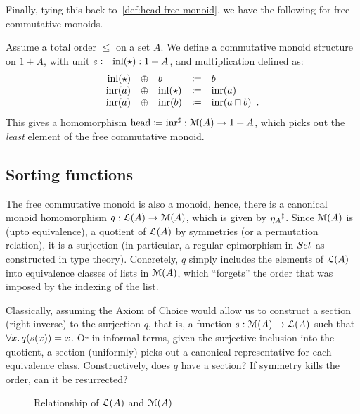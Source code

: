 Finally, tying this back to~\cref{def:head-free-monoid}, we have the following for free commutative monoids.
\begin{definition}
    \label{def:head-free-commutative-monoid}
    Assume a total order $\leq$ on a set $A$.
    We define a commutative monoid structure on $1 + A$,
    with unit \(e \defeq \inl(\ttt) : 1 + A\), and multiplication defined as:
    \[
        \begin{array}{rclcl}
            \inl(\ttt) & \oplus & b          & \defeq & b                         \\
            \inr(a)    & \oplus & \inl(\ttt) & \defeq & \inr(a)                   \\
            \inr(a)    & \oplus & \inr(b)    & \defeq & \inr(a \meet b) \enspace.
        \end{array}
    \]
    This gives a homomorphism \({\term{head} \defeq \ext{\inr}} : {\MM(A) \to 1 + A}\),
    which picks out the \emph{least} element of the free commutative monoid.
\end{definition}

\subsection{Sorting functions}
\label{sec:sorting}

The free commutative monoid is also a monoid, hence, there is a canonical monoid homomorphism
$q : \mathcal{L}(A) \to \mathcal{M}(A)$, which is given by ${\eta_A}^{\sharp}$.
%
Since $\mathcal{M}(A)$ is (upto equivalence), a quotient of $\mathcal{L}(A)$ by symmetries (or a permutation relation),
it is a surjection (in particular, a regular epimorphism in $\Set$ as constructed in type theory).
%
Concretely, $q$ simply includes the elements of $\mathcal{L}(A)$ into equivalence classes of lists in $\mathcal{M}(A)$,
which ``forgets'' the order that was imposed by the indexing of the list.

Classically, assuming the Axiom of Choice would allow us to construct a section (right-inverse) to the surjection $q$,
that is,
a function $s : \mathcal{M}(A) \to \mathcal{L}(A)$ such that $\forall x.\, q(s(x)) \id x$.
%
Or in informal terms, given the surjective inclusion into the quotient,
a section (uniformly) picks out a canonical representative for each equivalence class.
%
Constructively, does $q$ have a section? If symmetry kills the order, can it be resurrected?
\begin{figure}[H]
    \centering
    \caption{Relationship of $\mathcal{L}(A)$ and $\mathcal{M}(A)$}
    \label{fig:enter-label}
\end{figure}

